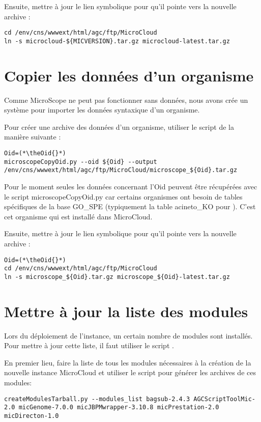 Ensuite, mettre à jour le lien symbolique pour qu'il pointe vers la nouvelle archive :
\begin{lstlisting}[style=bash]
cd /env/cns/wwwext/html/agc/ftp/MicroCloud
ln -s microcloud-${MICVERSION}.tar.gz microcloud-latest.tar.gz
\end{lstlisting}

\section{Copier les données d'un organisme} \label{sec:nouvelle_donne_organisme}

Comme MicroScope ne peut pas fonctionner sans données, nous avons crée un système
pour importer les données syntaxique d'un organisme.

Pour créer une archive des données d'un organisme, utiliser le script  de la manière suivante :
\begin{lstlisting}[style=bash]
Oid=(*\theOid{}*)
microscopeCopyOid.py --oid ${Oid} --output /env/cns/wwwext/html/agc/ftp/MicroCloud/microscope_${Oid}.tar.gz
\end{lstlisting}

\begin{mycolorbox}
    Pour le moment seules les données concernant l'Oid \theOid{} peuvent être récupérées avec le script microscopeCopyOid.py car certains organismes ont besoin de tables spécifiques de la base GO\_SPE (typiquement la table acineto\_KO pour \theOrg{}).
    C'est cet organisme qui est installé dans MicroCloud.
\end{mycolorbox}

Ensuite, mettre à jour le lien symbolique pour qu'il pointe vers la nouvelle archive :
\begin{lstlisting}[style=bash]
Oid=(*\theOid{}*)
cd /env/cns/wwwext/html/agc/ftp/MicroCloud
ln -s microscope_${Oid}.tar.gz microscope_${Oid}-latest.tar.gz
\end{lstlisting}

\section{Mettre à jour la liste des modules} \label{sec:nouvelle_liste_modules}

Lors du déploiement de l'instance, un certain nombre de modules sont installés.
Pour mettre à jour cette liste, il faut utiliser le script .

En premier lieu, faire la liste de tous les modules nécessaires à la création de la nouvelle instance MicroCloud et utiliser
le script  pour générer les archives de ces modules:
\begin{lstlisting}[style=bash]
createModulesTarball.py --modules_list bagsub-2.4.3 AGCScriptToolMic-2.0 micGenome-7.0.0 micJBPMwrapper-3.10.8 micPrestation-2.0 micDirecton-1.0
\end{lstlisting}

